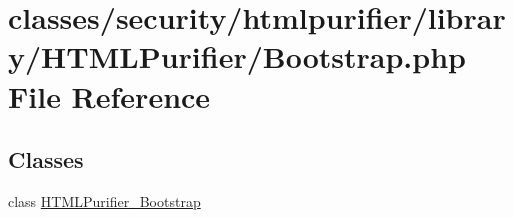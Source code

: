 \hypertarget{Bootstrap_8php}{\section{classes/security/htmlpurifier/library/\+H\+T\+M\+L\+Purifier/\+Bootstrap.php File Reference}
\label{Bootstrap_8php}
}
\subsection*{Classes}
\begin{DoxyCompactItemize}
\item 
class \hyperlink{classHTMLPurifier__Bootstrap}{H\+T\+M\+L\+Purifier\+\_\+\+Bootstrap}
\end{DoxyCompactItemize}
